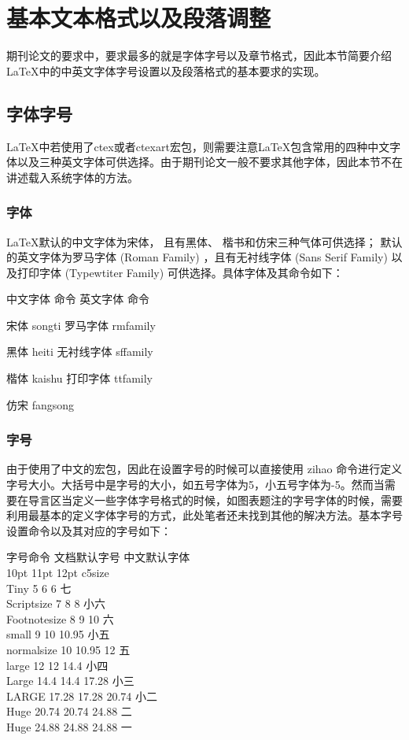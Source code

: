 \section{基本文本格式以及段落调整}%
期刊论文的要求中，要求最多的就是字体字号以及章节格式，因此本节简要介绍\LaTeX 中的中英文字体字号设置以及段落格式的基本要求的实现。
\subsection{字体字号}%
\LaTeX 中若使用了ctex或者ctexart宏包，则需要注意\LaTeX 包含常用的四种中文字体以及三种英文字体可供选择。由于期刊论文一般不要求其他字体，因此本节不在讲述载入系统字体的方法。
\subsubsection{字体}%
\LaTeX 默认的中文字体为宋体， 且有黑体、 楷书和仿宋三种气体可供选择； 默认的英文字体为罗马字体 (Roman Family) ，且有无衬线字体 (Sans Serif Family) 以及打印字体 (Typewtiter Family) 可供选择。具体字体及其命令如下：

中文字体	命令	英文字体	命令

宋体	songti	罗马字体	rmfamily

黑体	heiti	无衬线字体	sffamily

楷体	kaishu	打印字体	ttfamily

仿宋	fangsong		

\subsubsection{字号}
由于使用了中文的宏包，因此在设置字号的时候可以直接使用 zihao 命令进行定义字号大小。大括号中是字号的大小，如五号字体为5，小五号字体为-5。然而当需要在导言区当定义一些字体字号格式的时候，如图表题注的字号字体的时候，需要利用最基本的定义字体字号的方式，此处笔者还未找到其他的解决方法。基本字号设置命令以及其对应的字号如下：

字号命令	文档默认字号			中文默认字体\\
10pt	11pt	12pt	c5size \\
Tiny	5	6	6	七\\
Scriptsize	7	8	8	小六\\
Footnotesize	8	9	10	六\\
small 	9	10	10.95	小五\\
normalsize 	10	10.95	12	五\\
large	12	12	14.4	小四\\
Large	14.4	14.4	17.28	小三\\
LARGE 	17.28	17.28	20.74	小二\\
Huge	20.74	20.74	24.88	二 \\
Huge 	24.88	24.88	24.88	一\\